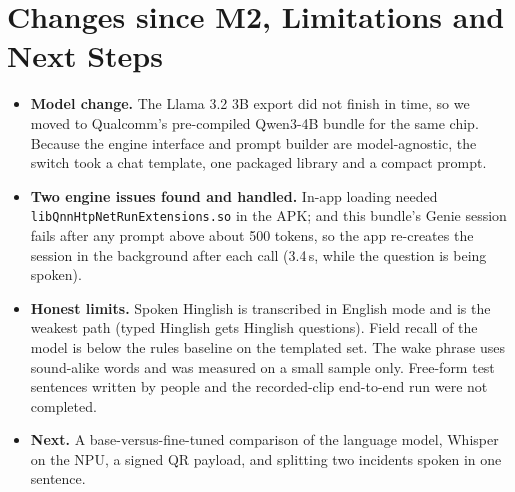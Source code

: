 \documentclass[9pt,a4paper]{extarticle}
\newcommand{\code}[1]{{\small\texttt{#1}}}
\begin{document}
\section{Changes since M2, Limitations and Next Steps}
\begin{itemize}
\item \textbf{Model change.} The Llama 3.2 3B export did not finish in time, so we moved to Qualcomm's pre-compiled Qwen3-4B bundle for the same chip. Because the engine interface and prompt builder are model-agnostic, the switch took a chat template, one packaged library and a compact prompt.
\item \textbf{Two engine issues found and handled.} In-app loading needed \code{libQnnHtpNetRunExtensions.so} in the APK; and this bundle's Genie session fails after any prompt above about 500 tokens, so the app re-creates the session in the background after each call (3.4\,s, while the question is being spoken).
\item \textbf{Honest limits.} Spoken Hinglish is transcribed in English mode and is the weakest path (typed Hinglish gets Hinglish questions). Field recall of the model is below the rules baseline on the templated set. The wake phrase uses sound-alike words and was measured on a small sample only. Free-form test sentences written by people and the recorded-clip end-to-end run were not completed.
\item \textbf{Next.} A base-versus-fine-tuned comparison of the language model, Whisper on the NPU, a signed QR payload, and splitting two incidents spoken in one sentence.
\end{itemize}
\end{document}
